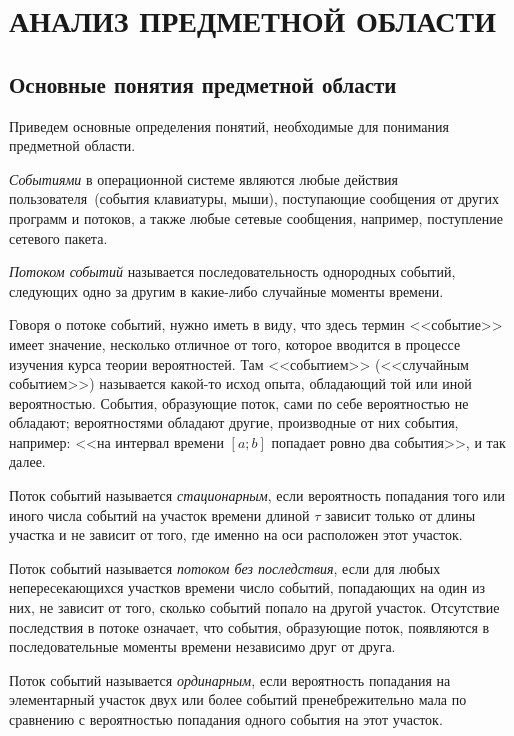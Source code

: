 \section[Анализ предметной области]{АНАЛИЗ ПРЕДМЕТНОЙ ОБЛАСТИ}

\subsection{Основные понятия предметной области}

Приведем основные определения понятий, необходимые для понимания предметной
области.

\textit{Событиями} в операционной системе являются любые действия пользователя~(события
клавиатуры, мыши), поступающие сообщения от других программ и потоков, а также
любые сетевые сообщения, например, поступление сетевого пакета.

\textit{Потоком событий} называется последовательность однородных событий,
следующих одно за другим в какие-либо случайные моменты времени.

Говоря о потоке событий, нужно иметь в виду, что здесь термин <<событие>>
имеет значение, несколько отличное от того, которое вводится в процессе
изучения курса теории вероятностей. Там <<событием>> (<<случайным событием>>)
называется какой-то исход опыта, обладающий той или иной вероятностью.
События, образующие поток, сами по себе вероятностью не обладают; вероятностями
обладают другие, производные от них события, например: <<на интервал времени
$[a;b]$ попадает ровно два события>>, и так далее. %

Поток событий называется
\textit{стационарным}, если вероятность попадания того или иного числа
событий на участок времени длиной $\tau$ зависит только от длины участка
и не зависит от того, где именно на оси расположен этот участок.

Поток событий называется \textit{потоком без последствия}, если для любых
непересекающихся участков времени число событий, попадающих на один из них,
не зависит от того, сколько событий попало на другой участок.
Отсутствие последствия в потоке означает, что события, образующие поток,
появляются в последовательные моменты времени независимо друг от друга.

Поток событий называется \textit{ординарным}, если вероятность попадания
на элементарный участок двух или более событий пренебрежительно мала
по сравнению с вероятностью попадания одного события на этот участок.


